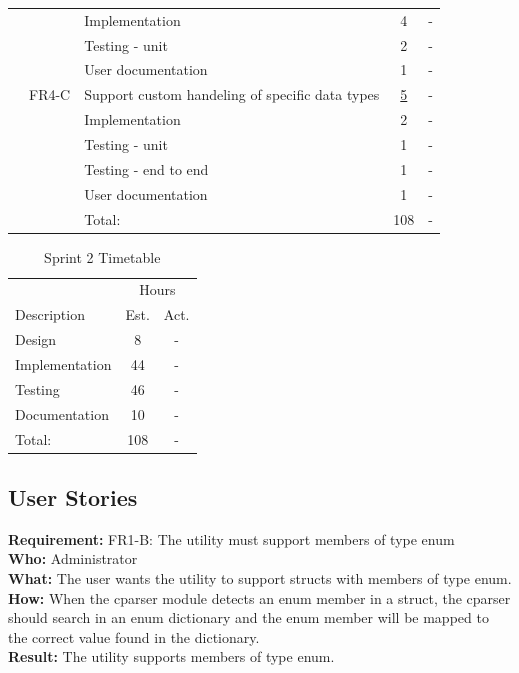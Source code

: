 \begin{table}[!ht]
\begin{tabularx}{\textwidth}{l l X c c}
	   &  & Implementation			   	& 4 & -\\
	   &  & Testing - unit				   	& 2 & -\\
	   &  & User documentation			& 1 & -\\
	\addlinespace
	13 & FR4-C & Support custom handeling of specific data types & \underline{ 5 } & - \\
	   &  & Implementation			   	& 2 & -\\
	   &  & Testing - unit				   	& 1 & -\\
	   &  & Testing - end to end			& 1 & -\\
	   &  & User documentation			& 1 & -\\
	\midrule
	& & Total: & 108  & - \\
	\bottomrule
\end{tabularx}
\end{table}



\begin{table}[!ht] \small \center
\caption{Sprint 2 Timetable\label{tab:sprint2time}}
\begin{tabularx}{\textwidth}{X c c}
	\toprule
	& \multicolumn{2}{c}{Hours} \\
	\cmidrule(r){2-3}
	Description & Est. & Act. \\
	\midrule
	Design & 8 & -\\
	\addlinespace
	Implementation & 44 & - \\
	\addlinespace
	Testing & 46 & -\\
	\addlinespace
	Documentation & 10 & -\\
	\midrule
	Total: & 108 & - \\
	\bottomrule
\end{tabularx}
\end{table}

\subsection{User Stories}

\textbf{Requirement:} FR1-B: The utility must support members of type enum\\
\textbf{Who:} Administrator\\
\textbf{What:} The user wants the utility to support structs with members of type enum.\\
\textbf{How:} When the cparser module detects an enum member in a struct, the cparser should search in an enum dictionary and the enum member will be mapped to the correct value found in the dictionary. \\
\textbf{Result:} The utility supports members of type enum.\\


